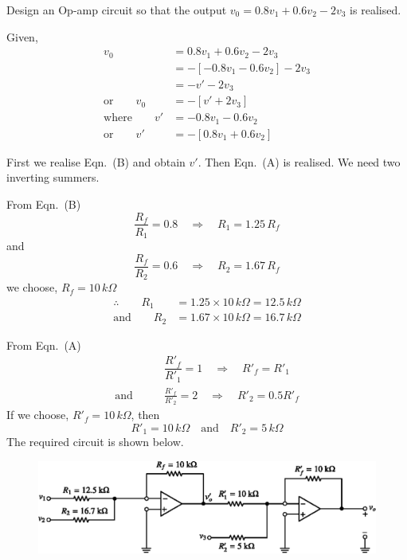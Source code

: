 \begin{example}\label{exam5.23}
Design an Op-amp circuit so that the output $v_{0}=0.8v_{1}+0.6v_{2}-2v_{3}$ is realised.
\end{example}

\begin{solution}
Given,
\begin{align*}
v_{0} &= 0.8v_{1}+0.6v_{2}-2v_{3}\\[3pt]
     &= -[-0.8v_{1}-0.6v_{2}]-2v_{3}\\[3pt]
     &= -v'-2v_{3}\\[3pt]
\text{or}\qquad v_{0} &=-[v'+2v_{3}]\tag{A}\\[4pt]
\text{where}\qquad v' &= -0.8v_{1}-0.6v_{2}\\[3pt]
\text{or}\qquad v' &= -[0.8v_{1}+0.6v_{2}]\tag{B}
\end{align*}

First we realise Eqn.~(B) and obtain $v'$. Then Eqn.~(A) is realised. We need two inverting summers.

\medskip


From Eqn.~(B)
$$
\dfrac{R_{f}}{R_{1}}=0.8\quad\Rightarrow\quad R_{1}=1.25\,R_{f}
$$
and
$$
\dfrac{R_{f}}{R_{2}}=0.6\quad\Rightarrow\quad R_{2}=1.67\,R_{f}
$$
we choose, $R_{f}=10\,k\Omega$
\begin{align*}
\therefore\qquad R_{1} &= 1.25\times 10\,k\Omega=12.5\,k\Omega\\[3pt]
\text{and}\qquad R_{2} &= 1.67\times 10\,k\Omega=16.7\,k\Omega
\end{align*}

\eject


From Eqn.~(A)
\begin{align*}
& \dfrac{R'_{f}}{R'_{1}}=1\quad\Rightarrow\quad R'_{f}=R'_{1}\\[3pt]
\text{and}\qquad & \frac{R'_{f}}{R'_{2}}=2\quad\Rightarrow\quad R'_{2}=0.5R'_{f}
\end{align*}
If we choose, $R'_{f}=10\,k\Omega$, then
$$
R'_{1}=10\,k\Omega\quad\text{and}\quad R'_{2}=5\,k\Omega
$$
The required circuit is shown below.
\begin{figure}[H]
\centering
\includegraphics{chap4/S3-EE-06-IN015.eps}
\end{figure}
\vskip -1cm
\end{solution}

